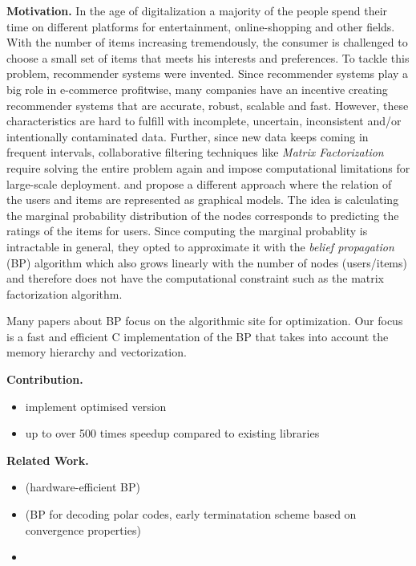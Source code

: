 \documentclass[letterpaper]{article}
\newcommand{\mypar}[1]{{\bf #1.}}
\begin{document}
\mypar{Motivation}
In the age of digitalization a majority of the people spend their time on different platforms for entertainment, online-shopping and other fields. With the number of items increasing tremendously, the consumer is challenged to choose a small set of items that meets his interests and preferences. To tackle this problem, recommender systems were invented. Since recommender systems play a big role in e-commerce profitwise, many companies have an incentive creating recommender systems that are accurate, robust, scalable and fast. However, these characteristics are hard to fulfill with incomplete, uncertain, inconsistent and/or intentionally contaminated data. Further, since new data keeps coming in frequent intervals, collaborative filtering techniques like \emph{Matrix Factorization} require solving the entire problem again and impose computational limitations for large-scale deployment. \cite{BPRS} and \cite{top-n-recommendation} propose a different approach where the relation of the users and items are represented as graphical models. The idea is calculating the marginal probability distribution of the nodes corresponds to predicting the ratings of the items for users. Since computing the marginal probablity is intractable in general, they opted to approximate it with the \emph{belief propagation} (BP) algorithm which also grows linearly with the number of nodes (users/items) and therefore does not have the computational constraint such as the matrix factorization algorithm.

Many papers about BP focus on the algorithmic site for optimization. Our focus is a fast and efficient C implementation of the BP that takes into account the memory hierarchy and vectorization.

\mypar{Contribution}
\begin{itemize}
\item implement optimised version
\item up to over 500 times speedup compared to existing libraries
\end{itemize}

\mypar{Related Work}
\begin{itemize}
\item (hardware-efficient BP) %
\item (BP for decoding polar codes, early terminatation scheme based on convergence properties) %
\item 
\end{itemize}
\end{document}
